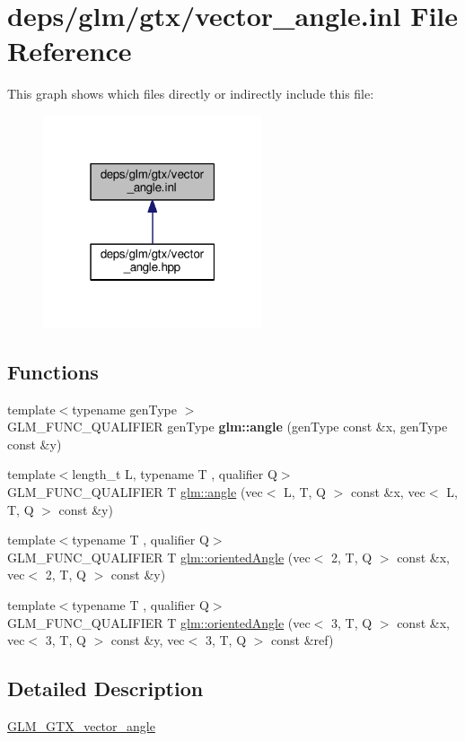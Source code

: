 \hypertarget{vector__angle_8inl}{}\section{deps/glm/gtx/vector\+\_\+angle.inl File Reference}
\label{vector__angle_8inl}
This graph shows which files directly or indirectly include this file\+:
\nopagebreak
\begin{figure}[H]
\begin{center}
\leavevmode
\includegraphics[width=183pt]{d3/de3/vector__angle_8inl__dep__incl}
\end{center}
\end{figure}
\subsection*{Functions}
\begin{DoxyCompactItemize}
\item 
\mbox{\label{vector__angle_8inl_a0634619b62db66fe6a4bd04da1feabea}} 
{\footnotesize template$<$typename gen\+Type $>$ }\\G\+L\+M\+\_\+\+F\+U\+N\+C\+\_\+\+Q\+U\+A\+L\+I\+F\+I\+ER gen\+Type {\bfseries glm\+::angle} (gen\+Type const \&x, gen\+Type const \&y)
\item 
{\footnotesize template$<$length\+\_\+t L, typename T , qualifier Q$>$ }\\G\+L\+M\+\_\+\+F\+U\+N\+C\+\_\+\+Q\+U\+A\+L\+I\+F\+I\+ER T \hyperlink{group__gtx__vector__angle_ga2e2917b4cb75ca3d043ac15ff88f14e1}{glm\+::angle} (vec$<$ L, T, Q $>$ const \&x, vec$<$ L, T, Q $>$ const \&y)
\item 
{\footnotesize template$<$typename T , qualifier Q$>$ }\\G\+L\+M\+\_\+\+F\+U\+N\+C\+\_\+\+Q\+U\+A\+L\+I\+F\+I\+ER T \hyperlink{group__gtx__vector__angle_ga9556a803dce87fe0f42fdabe4ebba1d5}{glm\+::oriented\+Angle} (vec$<$ 2, T, Q $>$ const \&x, vec$<$ 2, T, Q $>$ const \&y)
\item 
{\footnotesize template$<$typename T , qualifier Q$>$ }\\G\+L\+M\+\_\+\+F\+U\+N\+C\+\_\+\+Q\+U\+A\+L\+I\+F\+I\+ER T \hyperlink{group__gtx__vector__angle_ga706fce3d111f485839756a64f5a48553}{glm\+::oriented\+Angle} (vec$<$ 3, T, Q $>$ const \&x, vec$<$ 3, T, Q $>$ const \&y, vec$<$ 3, T, Q $>$ const \&ref)
\end{DoxyCompactItemize}


\subsection{Detailed Description}
\hyperlink{group__gtx__vector__angle}{G\+L\+M\+\_\+\+G\+T\+X\+\_\+vector\+\_\+angle} 